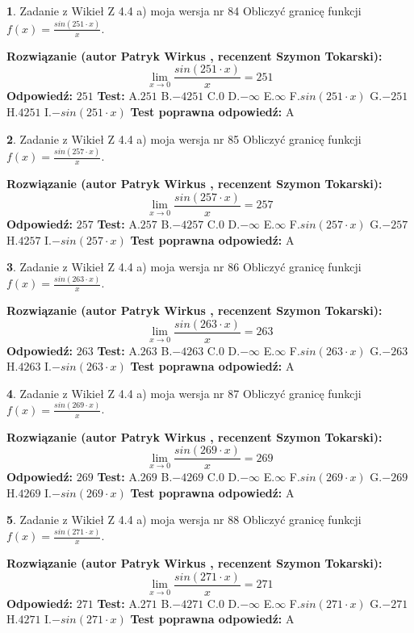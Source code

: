 \documentclass[12pt, a4paper]{article}
\theoremstyle{definition} %
\newtheorem{zad}{}
\newcommand{\zadStart}[1]{\begin{zad}#1\newline}
\newcommand{\zadStop}{\end{zad}}
\newcommand{\rozwStart}[2]{\noindent \textbf{Rozwiązanie (autor #1 , recenzent #2): }\newline}
\newcommand{\rozwStop}{\newline}
\newcommand{\odpStart}{\noindent \textbf{Odpowiedź:}\newline}
\newcommand{\odpStop}{\newline}
\newcommand{\testStart}{\noindent \textbf{Test:}\newline}
\newcommand{\testStop}{\newline}
\newcommand{\kluczStart}{\noindent \textbf{Test poprawna odpowiedź:}\newline}
\newcommand{\kluczStop}{\newline}
\begin{document}
\zadStart{Zadanie z Wikieł Z 4.4 a) moja wersja nr 84}
Obliczyć granicę funkcji $f(x)=\frac{sin(251\cdot x)}{x}$.
\zadStop
\rozwStart{Patryk Wirkus}{Szymon Tokarski}
$$\lim\limits_{x\to 0}\frac{sin(251\cdot x)}{x}=
251$$
\rozwStop
\odpStart
$251$
\odpStop
\testStart
A.$251$
B.$-4251$
C.$0$
D.$-\infty$
E.$\infty$
F.$sin(251\cdot x)$
G.$-251$
H.$4251$
I.$-sin(251\cdot x)$
\testStop
\kluczStart
A
\kluczStop



\zadStart{Zadanie z Wikieł Z 4.4 a) moja wersja nr 85}
Obliczyć granicę funkcji $f(x)=\frac{sin(257\cdot x)}{x}$.
\zadStop
\rozwStart{Patryk Wirkus}{Szymon Tokarski}
$$\lim\limits_{x\to 0}\frac{sin(257\cdot x)}{x}=
257$$
\rozwStop
\odpStart
$257$
\odpStop
\testStart
A.$257$
B.$-4257$
C.$0$
D.$-\infty$
E.$\infty$
F.$sin(257\cdot x)$
G.$-257$
H.$4257$
I.$-sin(257\cdot x)$
\testStop
\kluczStart
A
\kluczStop



\zadStart{Zadanie z Wikieł Z 4.4 a) moja wersja nr 86}
Obliczyć granicę funkcji $f(x)=\frac{sin(263\cdot x)}{x}$.
\zadStop
\rozwStart{Patryk Wirkus}{Szymon Tokarski}
$$\lim\limits_{x\to 0}\frac{sin(263\cdot x)}{x}=
263$$
\rozwStop
\odpStart
$263$
\odpStop
\testStart
A.$263$
B.$-4263$
C.$0$
D.$-\infty$
E.$\infty$
F.$sin(263\cdot x)$
G.$-263$
H.$4263$
I.$-sin(263\cdot x)$
\testStop
\kluczStart
A
\kluczStop



\zadStart{Zadanie z Wikieł Z 4.4 a) moja wersja nr 87}
Obliczyć granicę funkcji $f(x)=\frac{sin(269\cdot x)}{x}$.
\zadStop
\rozwStart{Patryk Wirkus}{Szymon Tokarski}
$$\lim\limits_{x\to 0}\frac{sin(269\cdot x)}{x}=
269$$
\rozwStop
\odpStart
$269$
\odpStop
\testStart
A.$269$
B.$-4269$
C.$0$
D.$-\infty$
E.$\infty$
F.$sin(269\cdot x)$
G.$-269$
H.$4269$
I.$-sin(269\cdot x)$
\testStop
\kluczStart
A
\kluczStop



\zadStart{Zadanie z Wikieł Z 4.4 a) moja wersja nr 88}
Obliczyć granicę funkcji $f(x)=\frac{sin(271\cdot x)}{x}$.
\zadStop
\rozwStart{Patryk Wirkus}{Szymon Tokarski}
$$\lim\limits_{x\to 0}\frac{sin(271\cdot x)}{x}=
271$$
\rozwStop
\odpStart
$271$
\odpStop
\testStart
A.$271$
B.$-4271$
C.$0$
D.$-\infty$
E.$\infty$
F.$sin(271\cdot x)$
G.$-271$
H.$4271$
I.$-sin(271\cdot x)$
\testStop
\kluczStart
A
\kluczStop
\end{document}
